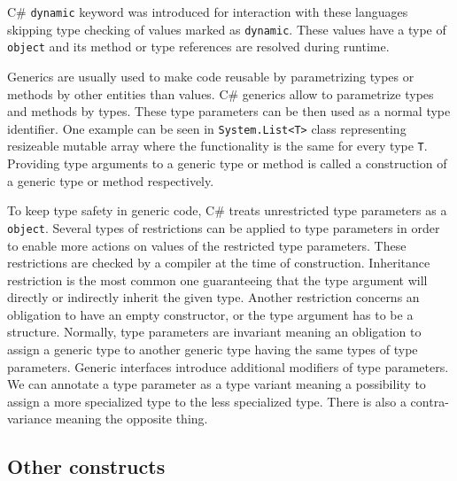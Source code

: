 C\# \texttt{dynamic} keyword was introduced for interaction with these languages skipping type checking of values marked as \texttt{dynamic}.
These values have a type of \texttt{object} and its method or type references are resolved during runtime.
\par
{}
Generics are usually used to make code reusable by parametrizing types or methods by other entities than values.
C\# generics allow to parametrize types and methods by types.
These type parameters can be then used as a normal type identifier.
One example can be seen in \texttt{System.List<T>} class representing resizeable mutable array where the functionality is the same for every type \texttt{T}.
Providing type arguments to a generic type or method is called a construction of a generic type or method respectively.
\par
{}
To keep type safety in generic code, C\# treats unrestricted type parameters as a \texttt{object}.
Several types of restrictions can be applied to type parameters in order to enable more actions on values of the restricted type parameters.
These restrictions are checked by a compiler at the time of construction.
Inheritance restriction is the most common one guaranteeing that the type argument will directly or indirectly inherit the given type.
Another restriction concerns an obligation to have an empty constructor, or the type argument has to be a structure.
Normally, type parameters are invariant meaning an obligation to assign a generic type to another generic type having the same types of type parameters.
Generic interfaces introduce additional modifiers of type parameters.
We can annotate a type parameter as a type variant meaning a possibility to assign a more specialized type to the less specialized type.
There is also a contra-variance meaning the opposite thing.

\subsection{Other constructs}

